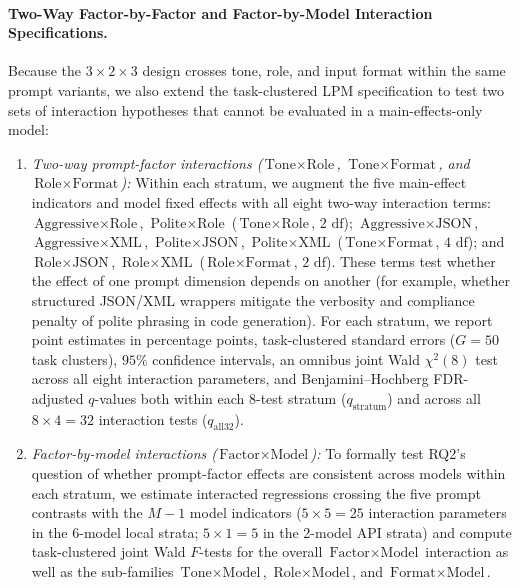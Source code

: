 \documentclass[a4paper,fleqn]{cas-sc}
\providecommand{\tightlist}{%
  \setlength{\itemsep}{0pt}\setlength{\parskip}{0pt}}
\begin{document}
\paragraph{Two-Way Factor-by-Factor and Factor-by-Model Interaction Specifications.}
Because the $3 \times 2 \times 3$ design crosses tone, role, and input format within the same prompt variants, we also extend the task-clustered LPM specification to test two sets of interaction hypotheses that cannot be evaluated in a main-effects-only model:
\begin{enumerate}
\tightlist
\item \emph{Two-way prompt-factor interactions ($\text{Tone} \times \text{Role}$, $\text{Tone} \times \text{Format}$, and $\text{Role} \times \text{Format}$):} Within each stratum, we augment the five main-effect indicators and model fixed effects with all eight two-way interaction terms: $\text{Aggressive} \times \text{Role}$, $\text{Polite} \times \text{Role}$ ($\text{Tone} \times \text{Role}$, $2\text{ df}$); $\text{Aggressive} \times \text{JSON}$, $\text{Aggressive} \times \text{XML}$, $\text{Polite} \times \text{JSON}$, $\text{Polite} \times \text{XML}$ ($\text{Tone} \times \text{Format}$, $4\text{ df}$); and $\text{Role} \times \text{JSON}$, $\text{Role} \times \text{XML}$ ($\text{Role} \times \text{Format}$, $2\text{ df}$). These terms test whether the effect of one prompt dimension depends on another (for example, whether structured JSON/XML wrappers mitigate the verbosity and compliance penalty of polite phrasing in code generation). For each stratum, we report point estimates in percentage points, task-clustered standard errors ($G = 50$ task clusters), $95\%$ confidence intervals, an omnibus joint Wald $\chi^2(8)$ test across all eight interaction parameters, and Benjamini--Hochberg FDR-adjusted $q$-values both within each 8-test stratum ($q_{\text{stratum}}$) and across all $8 \times 4 = 32$ interaction tests ($q_{\text{all32}}$).
\item \emph{Factor-by-model interactions ($\text{Factor} \times \text{Model}$):} To formally test RQ2's question of whether prompt-factor effects are consistent across models within each stratum, we estimate interacted regressions crossing the five prompt contrasts with the $M - 1$ model indicators ($5 \times 5 = 25$ interaction parameters in the 6-model local strata; $5 \times 1 = 5$ in the 2-model API strata) and compute task-clustered joint Wald $F$-tests for the overall $\text{Factor} \times \text{Model}$ interaction as well as the sub-families $\text{Tone} \times \text{Model}$, $\text{Role} \times \text{Model}$, and $\text{Format} \times \text{Model}$.
\end{enumerate}
\end{document}
